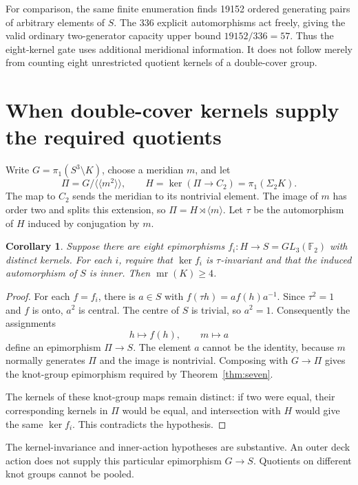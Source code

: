 \documentclass[11pt]{article}
\newtheorem{corollary}[theorem]{Corollary}
\newcommand{\mr}{\operatorname{mr}}
\newcommand{\F}{\mathbb F}
\begin{document}
For comparison, the same finite enumeration finds 19152 ordered
generating pairs of arbitrary elements of $S$.  The 336 explicit
automorphisms act freely, giving the valid ordinary two-generator
capacity upper bound $19152/336=57$.  Thus the eight-kernel gate uses
additional meridional information.  It does not follow merely from
counting eight unrestricted quotient kernels of a double-cover group.

\section{When double-cover kernels supply the required quotients}

Write $G=\pi_1(S^3\setminus K)$, choose a meridian $m$, and let
\[
 \Pi=G/\langle\!\langle m^2\rangle\!\rangle,
 \qquad H=\ker(\Pi\to C_2)=\pi_1(\Sigma_2K).
\]
The map to $C_2$ sends the meridian to its nontrivial element.
The image of $m$ has order two and splits this extension, so
$\Pi=H\rtimes\langle m\rangle$.  Let $\tau$ be the automorphism of
$H$ induced by conjugation by $m$.

\begin{corollary}\label{cor:deck}
Suppose there are eight epimorphisms $f_i:H\to S=GL_3(\F_2)$
with distinct kernels.  For each $i$, require that $\ker f_i$ is
$\tau$-invariant and that the induced automorphism of $S$ is inner.
Then $\mr(K)\ge4$.
\end{corollary}
\begin{proof}
For each $f=f_i$, there is $a\in S$ with
$f(\tau h)=af(h)a^{-1}$.  Since $\tau^2=1$ and $f$ is onto,
$a^2$ is central.  The centre of $S$ is trivial, so $a^2=1$.
Consequently the assignments
\[
                 h\longmapsto f(h),\qquad m\longmapsto a
\]
define an epimorphism $\Pi\to S$.  The element $a$ cannot be the
identity, because $m$ normally generates $\Pi$ and the image is
nontrivial.  Composing with $G\to\Pi$ gives the knot-group
epimorphism required by Theorem~\ref{thm:seven}.

The kernels of these knot-group maps remain distinct: if two were
equal, their corresponding kernels in $\Pi$ would be equal, and
intersection with $H$ would give the same $\ker f_i$.  This
contradicts the hypothesis.
\end{proof}

The kernel-invariance and inner-action hypotheses are substantive.
An outer deck action does not supply this particular epimorphism
$G\to S$.  Quotients on different knot groups cannot be pooled.
\end{document}
